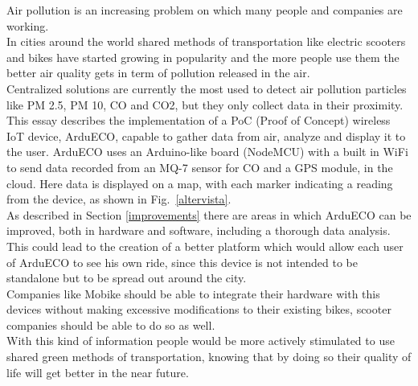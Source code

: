 \documentclass[conference]{IEEEtran}
\begin{document}
	Air pollution is an increasing problem on which many people and companies are working.\\
	In cities around the world shared methods of transportation like electric scooters and bikes have started growing in popularity and the more people use them the better air quality gets in term of pollution released in the air.\\
	Centralized solutions are currently the most used to detect air pollution particles like PM 2.5, PM 10, CO and CO2, but they only collect data in their proximity.\\
	This essay describes the implementation of a PoC (Proof of Concept) wireless IoT device, ArduECO, capable to gather data from air, analyze and display it to the user.
	ArduECO uses an Arduino-like board (NodeMCU) with a built in WiFi to send data recorded from an MQ-7 sensor for CO and a GPS module, in the cloud.
	Here data is displayed on a map, with each marker indicating a reading from the device, as shown in Fig.~\ref{altervista}.\\
	As described in Section \ref{improvements} there are areas in which ArduECO can be improved, both in hardware and software, including a thorough data analysis.
	This could lead to the creation of a better platform which would allow each user of ArduECO to see his own ride, since this device is not intended to be standalone but to be spread out around the city.\\
	Companies like Mobike should be able to integrate their hardware with this devices without making excessive modifications to their existing bikes, scooter companies should be able to do so as well.\\
	With this kind of information people would be more actively stimulated to use shared green methods of transportation, knowing that by doing so their quality of life will get better in the near future.
		

\end{document}
